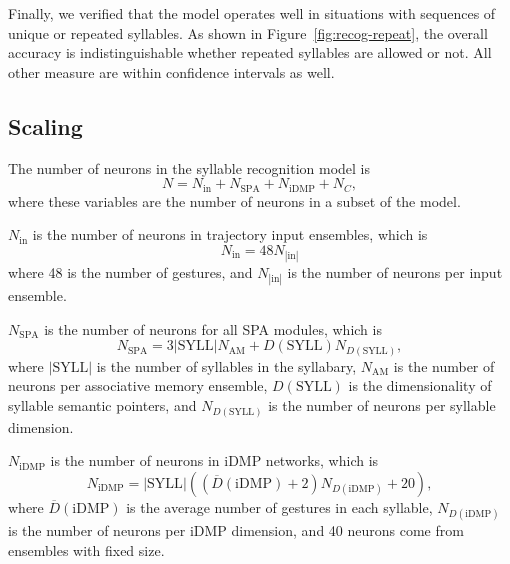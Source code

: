 
Finally, we verified that the model
operates well in situations with
sequences of unique or repeated syllables.
As shown in Figure~\ref{fig:recog-repeat},
the overall accuracy is indistinguishable
whether repeated syllables are allowed or not.
All other measure are within confidence intervals as well.

\subsection{Scaling}
\label{sec:res-recog-scaling}

The number of neurons in the
syllable recognition model is
\begin{equation}
  N = N_{\text{in}} + N_{\text{SPA}} + N_{\text{iDMP}} + N_C,
\end{equation}
where these variables
are the number of neurons in
a subset of the model.

$N_{\text{in}}$ is the number of neurons
in trajectory input ensembles, which is
\begin{equation}
  N_{\text{in}} = 48 N_{|\text{in}|}
\end{equation}
where 48 is the number of gestures,
and $N_{|\text{in}|}$ is the number of neurons
per input ensemble.

$N_{\text{SPA}}$ is the number of
neurons for all SPA modules,
which is
\begin{equation}
  N_{\text{SPA}} = 3 |\text{SYLL}| N_{\text{AM}}
    + D(\text{SYLL}) N_{D(\text{SYLL})},
\end{equation}
where $|\text{SYLL}|$ is the number of
syllables in the syllabary,
$N_{\text{AM}}$ is the number of neurons
per associative memory ensemble,
$D(\text{SYLL})$ is the dimensionality
of syllable semantic pointers,
and $N_{D(\text{SYLL})}$ is the number of neurons
per syllable dimension.

$N_{\text{iDMP}}$ is the number of neurons
in iDMP networks, which is
\begin{equation}
  N_{\text{iDMP}} = |\text{SYLL}| \left( \left(\overline{D}(\text{iDMP})
  + 2 \right) N_{D(\text{iDMP})} + 20 \right),
\end{equation}
where $\overline{D}(\text{iDMP})$ is the average
number of gestures in each syllable,
$N_{D(\text{iDMP})}$ is the number of neurons
per iDMP dimension,
and 40 neurons come from ensembles with fixed size.


